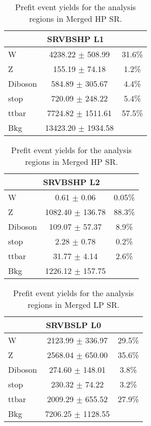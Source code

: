 \begin{table}
\caption{Prefit event yields for the analysis regions in \olep Merged HP SR.}
\label{tab:PrefitYield_1lepHPSR_Per}
\begin{center}
\begin{tabular}{|l|c|c|}
\hline
  \multicolumn{3}{|c|}{SRVBSHP L1}\\ \hline
W & 4238.22 $\pm$ 508.99 & 31.6\% \\
Z & 155.19 $\pm$ 74.18 & 1.2\%\\
Diboson & 584.89 $\pm$ 305.67& 4.4\%\\
stop & 720.09 $\pm$ 248.22 & 5.4\%\\
ttbar & 7724.82 $\pm$ 1511.61 & 57.5\%\\
\hline
Bkg & 13423.20 $\pm$ 1934.58 & \\
\hline
\end{tabular}
\end{center}
\end{table}


\begin{table}
\caption{Prefit event yields for the analysis regions in \tlep Merged HP SR.}
\label{tab:PrefitYield_2lepHPSR_Per}
\begin{center}
\begin{tabular}{|l|c|c|}
\hline
  \multicolumn{3}{|c|}{SRVBSHP L2}\\ \hline
W & 0.61 $\pm$ 0.06 & 0.05\%\\
Z & 1082.40 $\pm$ 136.78 & 88.3\%\\
Diboson & 109.07 $\pm$ 57.37& 8.9\% \\
stop & 2.28 $\pm$ 0.78 & 0.2\%\\
ttbar & 31.77 $\pm$ 4.14 & 2.6\%\\
\hline
Bkg & 1226.12 $\pm$ 157.75 & \\\hline
\end{tabular}
\end{center}
\end{table}    


\begin{table} [h]
\caption{Prefit event yields for the analysis regions in \zlep Merged LP SR.}
\label{tab:PrefitYield_0lepLPSR_Per}
\begin{center}
\begin{tabular}{|l|c|c|}
\hline
  \multicolumn{3}{|c|}{SRVBSLP L0}\\ \hline  
W & 2123.99 $\pm$ 336.97 & 29.5\% \\
Z & 2568.04 $\pm$ 650.00 & 35.6\% \\
Diboson & 274.60 $\pm$ 148.01 & 3.8\% \\
stop & 230.32 $\pm$ 74.22 & 3.2\%\\
ttbar & 2009.29 $\pm$ 655.52& 27.9\%\\
\hline
Bkg & 7206.25 $\pm$ 1128.55 & \\
\hline
\end{tabular}
\end{center}
\end{table}


